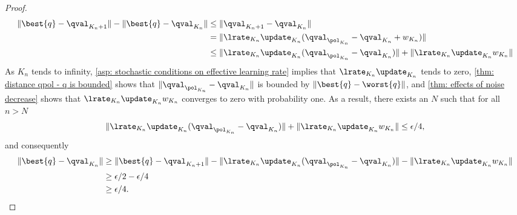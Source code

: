 \begin{proof}
\begin{align}
    \nonumber
    \| \best{q} - \qval_{K_n + 1} \| - \| \best{q} - \qval_{K_n} \|
    &\leq \| \qval_{K_n + 1} - \qval_{K_n} \|
    \\
    \nonumber
    &= \| \lrate_{K_n} \update_{K_n} ( \qval_{\pol_{K_n}} - \qval_{K_n} + w_{K_n} ) \|
    \\
    \nonumber
    &\leq \| \lrate_{K_n} \update_{K_n}( \qval_{\pol_{K_n}} - \qval_{K_n} ) \| + \| \lrate_{K_n} \update_{K_n} w_{K_n} \|
\end{align}
As $K_n$ tends to infinity,
\autoref{asp: stochastic conditions on effective learning rate} implies that $\lrate_{K_n} \update_{K_n}$ tends to zero,
\autoref{thm: distance qpol - q is bounded} shows that $\| \qval_{\pol_{K_n}} - \qval_{K_n} \|$ is bounded by $\| \best{q} - \worst{q} \|$,
and \autoref{thm: effects of noise decrease} shows that $\lrate_{K_n} \update_{K_n} w_{K_n}$ converges to zero with probability one.
As a result, there exists an $N$ such that for all $n>N$
\begin{align*}
    \| \lrate_{K_n} \update_{K_n}( \qval_{\pol_{K_n}} - \qval_{K_n} ) \| + \| \lrate_{K_n} \update_{K_n} w_{K_n} \| \leq \epsilon/4 ,
\end{align*}
and consequently
\begin{align}
    \nonumber
    \| \best{q} - \qval_{K_n} \| 
    &\geq
    \| \best{q} - \qval_{K_n + 1} \|  
    - \| \lrate_{K_n} \update_{K_n}( \qval_{\pol_{K_n}} - \qval_{K_n} ) \|
    - \| \lrate_{K_n} \update_{K_n} w_{K_n} \|
    \\
    \nonumber
    &\geq \epsilon/2 - \epsilon/4
    \\
    \label{eq: lower bound on beginning of upcrossing}
    &\geq \epsilon/4 .
\end{align}


\end{proof}
